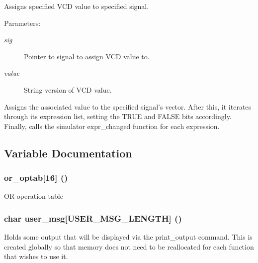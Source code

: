 Assigns specified VCD value to specified signal.

\begin{Desc}
\item[Parameters:]
\begin{description}
\item[{\em sig}]Pointer to signal to assign VCD value to. \item[{\em value}]String version of VCD value.\end{description}
\end{Desc}
Assigns the associated value to the specified signal's vector. After this, it iterates through its expression list, setting the TRUE and FALSE bits accordingly. Finally, calls the simulator expr\_\-changed function for each expression. 

\subsection{Variable Documentation}
\subsubsection{ or\_\-optab[16] ()}\label{signal_8c_a0}


OR operation table 
\subsubsection{\setlength{\rightskip}{0pt plus 5cm}char user\_\-msg[USER\_\-MSG\_\-LENGTH] ()}\label{signal_8c_a1}


Holds some output that will be displayed via the print\_\-output command. This is created globally so that memory does not need to be reallocated for each function that wishes to use it. 